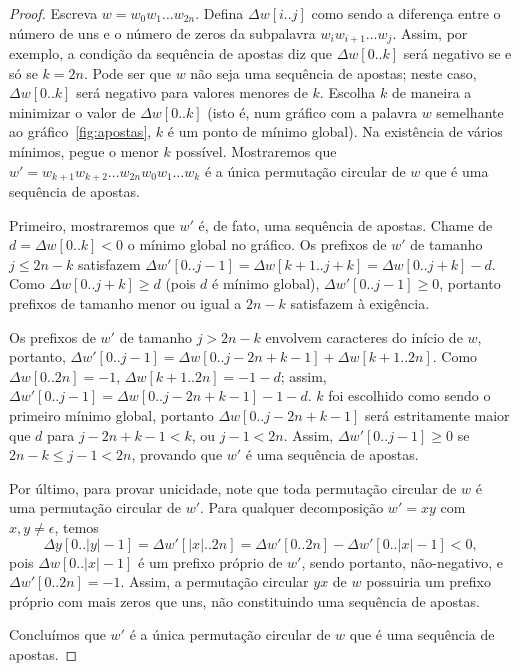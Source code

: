 \begin{proof}
    Escreva $w = w_0 w_1 \dots w_{2n}$.
    Defina $\Delta w[i..j]$ como sendo a diferença entre
    o número de uns e o número de zeros
    da subpalavra $w_i w_{i+1} \dots w_j$.
    Assim,
    por exemplo,
    a condição da sequência de apostas
    diz que $\Delta w[0..k]$ será negativo
    se e só se $k = 2n$.
    Pode ser que $w$ não seja uma sequência de apostas;
    neste caso, $\Delta w[0..k]$ será negativo
    para valores menores de $k$.
    Escolha $k$ de maneira a minimizar o valor de $\Delta w[0..k]$
    (isto é, num gráfico com a palavra $w$ semelhante ao gráfico~\ref{fig:apostas},
    $k$ é um ponto de mínimo global).
    Na existência de vários mínimos,
    pegue o menor $k$ possível.
    Mostraremos que $w' = w_{k+1} w_{k+2} \dots w_{2n} w_0 w_1 \dots w_k$
    é a única permutação circular de $w$
    que é uma sequência de apostas.

    Primeiro,
    mostraremos que $w'$ é,
    de fato,
    uma sequência de apostas.
    Chame de $d = \Delta w[0..k] < 0$ o mínimo global no gráfico.
    Os prefixos de $w'$ de tamanho $j \leq 2n-k$ satisfazem
    $\Delta w'[0..j-1] = \Delta w[k+1..j+k] = \Delta w[0..j+k] - d$.
    Como $\Delta w[0..j+k] \geq d$
    (pois $d$ é mínimo global),
    $\Delta w'[0..j-1] \geq 0$,
    portanto prefixos de tamanho menor ou igual a $2n - k$
    satisfazem à exigência.

    Os prefixos de $w'$ de tamanho $j > 2n - k$
    envolvem caracteres do início de $w$,
    portanto, $\Delta w'[0..j-1] = \Delta w[0..j-2n+k-1] + \Delta w[k+1..2n]$.
    Como $\Delta w[0..2n] = -1$,
    $\Delta w[k+1..2n] = -1-d$;
    assim, $\Delta w'[0..j-1] = \Delta w[0..j-2n+k-1] - 1 - d$.
    $k$ foi escolhido como sendo o primeiro mínimo global,
    portanto $\Delta w[0..j-2n+k-1]$ será estritamente maior que $d$
    para $j - 2n + k - 1 < k$, ou $j-1 < 2n$.
    Assim,
    $\Delta w'[0..j-1] \geq 0$
    se $2n - k \leq j-1 < 2n$,
    provando que $w'$ é uma sequência de apostas.

    Por último, para provar unicidade,
    note que toda permutação circular de $w$ é uma permutação circular de $w'$.
    Para qualquer decomposição $w' = xy$ com $x, y \neq \epsilon$,
    temos
    \begin{equation*}
        \Delta y[0..|y|-1] = \Delta w'[|x|..2n] = \Delta w'[0..2n] - \Delta w'[0..|x|-1]
        < 0,
    \end{equation*}
    pois $\Delta w[0..|x|-1]$ é um prefixo próprio de $w'$,
    sendo portanto, não-negativo,
    e $\Delta w'[0..2n] = -1$.
    Assim, a permutação circular $yx$ de $w$
    possuiria um prefixo próprio com mais zeros que uns,
    não constituindo uma sequência de apostas.

    Concluímos que $w'$ é a única permutação circular de $w$
    que é uma sequência de apostas.
\end{proof}

